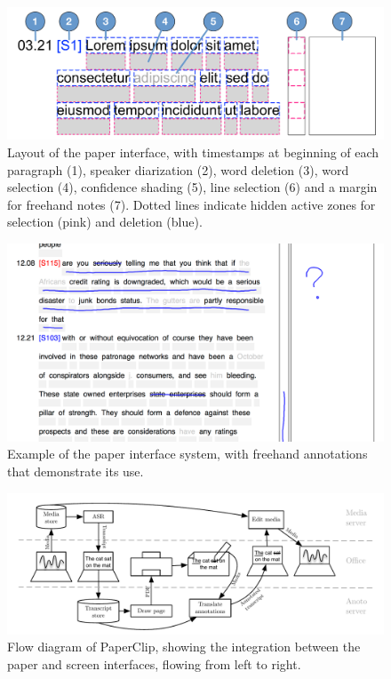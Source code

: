 \begin{figure}[t]
  \centering
  \includegraphics[width=\columnwidth]{figs/paper-interface-diagram}
  \caption[Layout of the paper interface.]{Layout of the paper interface, with timestamps at beginning of each
  paragraph (1), speaker diarization (2), word deletion (3), word selection (4), confidence shading (5), line selection
(6) and a margin for freehand notes (7). Dotted lines indicate hidden active zones for selection (pink) and deletion
(blue).}
  \label{fig:paper-interface-diagram}
\end{figure}

\begin{figure}[p]
  \centering
  \includegraphics[width=\columnwidth]{figs/paper-interface-example-annotations.png}
  \caption{Example of the paper interface system, with freehand annotations that demonstrate its use.}
  \label{fig:paper-interface-example}
\end{figure}

\begin{figure}[p]
  \centering
  \includegraphics[width=\columnwidth]{figs/uist-sys-diagram}
  \caption{Flow diagram of PaperClip, showing the integration between the paper and screen interfaces, flowing from
  left to right.}
  \label{fig:paper-screen-integration}
\end{figure}


